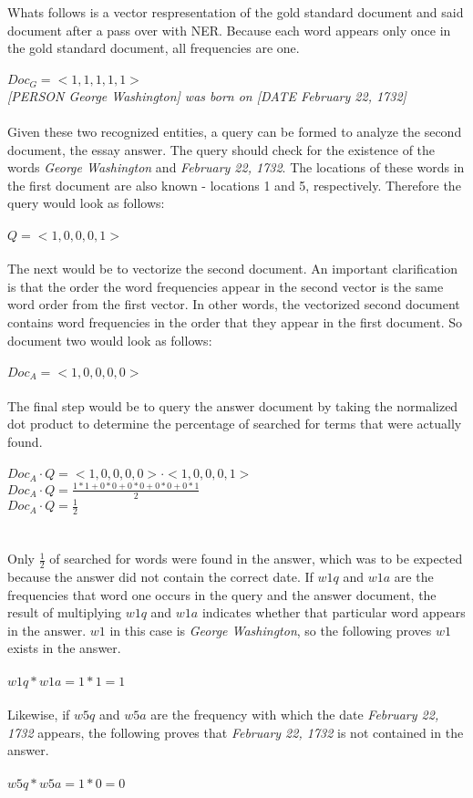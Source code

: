 Whats follows is a vector respresentation of the gold standard document and said document after a pass over with NER. Because each word appears only once in the gold standard document, all frequencies are one.
\\\\
$Doc_G=<1, 1, 1, 1, 1>$\\
\textit{[PERSON George Washington] was born on [DATE February 22, 1732]}
\\\\
Given these two recognized entities, a query can be formed to analyze the second document, the essay answer. The query should check for the existence of the words \textit{George Washington} and \textit{February 22, 1732}. The locations of these words in the first document are also known - locations 1 and 5, respectively. Therefore the query would look as follows:
\\\\
$Q=<1, 0, 0 , 0, 1>$
\\\\
The next would be to vectorize the second document. An important clarification is that the order the word frequencies appear in the second vector is the same word order from the first vector. In other words, the vectorized second document contains word frequencies in the order that they appear in the first document. So document two would look as follows:
\\\\
$Doc_A=<1, 0, 0, 0, 0>$
\\\\
The final step would be to query the answer document by taking the normalized dot product to determine the percentage of searched for terms that were actually found.
\\\\
$Doc_A \cdot Q = <1, 0, 0, 0, 0> \cdot <1, 0, 0, 0, 1>$\\
$Doc_A \cdot Q = \frac{1*1 + 0*0 + 0*0 + 0*0 + 0*1}{2} $\\
$Doc_A \cdot Q = \frac{1}{2}$\\
\\\\
Only $\frac{1}{2}$ of searched for words were found in the answer, which was to be expected because the answer did not contain the correct date. If $w1q$ and $w1a$ are the frequencies that word one occurs in the query and the answer document, the result of multiplying $w1q$ and $w1a$ indicates whether that particular word appears in the answer. $w1$ in this case is \textit{George Washington}, so the following proves $w1$ exists in the answer.
\\\\
$w1q * w1a = 1*1 = 1$
\\\\
Likewise, if $w5q$ and $w5a$ are the frequency with which the date \textit{February 22, 1732} appears, the following proves that \textit{February 22, 1732} is not contained in the answer.
\\\\
$w5q * w5a = 1*0 = 0$
\\\

